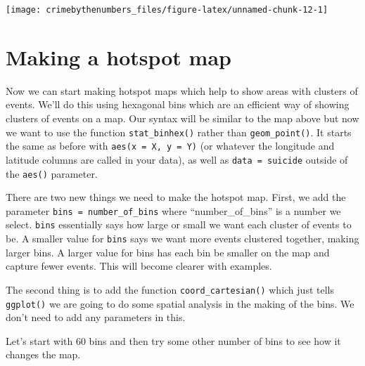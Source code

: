 \documentclass[
  12pt,
  openany]{book}
\newenvironment{Shaded}{\begin{snugshade}}{\end{snugshade}}
\newcommand{\AttributeTok}[1]{\textcolor[rgb]{0.61,0.61,0.61}{#1}}
\newcommand{\FunctionTok}[1]{\textcolor[rgb]{0,0,0}{#1}}
\newcommand{\NormalTok}[1]{#1}
\newcommand{\SpecialCharTok}[1]{\textcolor[rgb]{0,0,0}{#1}}
\newcommand{\StringTok}[1]{\textcolor[rgb]{0.5,0.5,0.5}{#1}}
\begin{document}
\begin{Shaded}
\end{Shaded}

\begin{center}\texttt{[image: crimebythenumbers\_files/figure-latex/unnamed-chunk-12-1]} \end{center}

\hypertarget{making-a-hotspot-map}{%
\section{Making a hotspot map}\label{making-a-hotspot-map}}

Now we can start making hotspot maps which help to show areas with clusters of events. We'll do this using hexagonal bins which are an efficient way of showing clusters of events on a map. Our syntax will be similar to the map above but now we want to use the function \texttt{stat\_binhex()} rather than \texttt{geom\_point()}. It starts the same as before with \texttt{aes(x\ =\ X,\ y\ =\ Y)} (or whatever the longitude and latitude columns are called in your data), as well as \texttt{data\ =\ suicide} outside of the \texttt{aes()} parameter.

There are two new things we need to make the hotspot map. First, we add the parameter \texttt{bins\ =\ number\_of\_bins} where ``number\_of\_bins'' is a number we select. \texttt{bins} essentially says how large or small we want each cluster of events to be. A smaller value for \texttt{bins} says we want more events clustered together, making larger bins. A larger value for bins has each bin be smaller on the map and capture fewer events. This will become clearer with examples.

The second thing is to add the function \texttt{coord\_cartesian()} which just tells \texttt{ggplot()} we are going to do some spatial analysis in the making of the bins. We don't need to add any parameters in this.

Let's start with 60 bins and then try some other number of bins to see how it changes the map.
\end{document}
